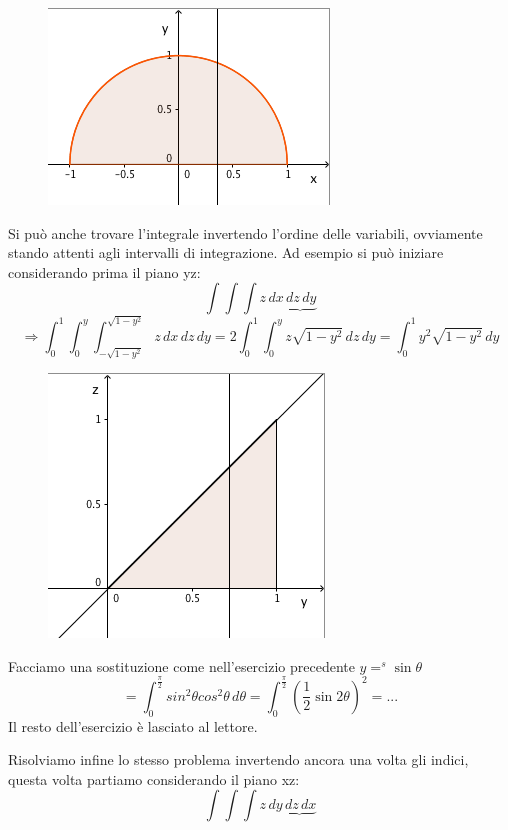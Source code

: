 \documentclass[10pt]{article}
\theoremstyle{plain}
\theoremstyle{definition}
\begin{document}
\begin{figure}[ht]
\centering
\centerline{\includegraphics[width=75 mm,scale=1]{latex_img2.png}}
\label{fig: }
\end{figure}
Si può anche trovare l'integrale invertendo l'ordine delle variabili, ovviamente stando attenti agli intervalli di integrazione. Ad esempio si può iniziare considerando prima il piano yz:
$$\int \int \int z \,dx \underbrace{\,dz \,dy}$$
$$\Rightarrow \int_{0}^{1} \int_{0}^{y} \int_{-\sqrt{1-y^2}}^{\sqrt{1-y^2}}z \,dx \,dz \,dy = 2\int_{0}^{1} \int_{0}^{y} z \sqrt{1-y^2} \,dz \,dy = \int_{0}^{1} y^2 \sqrt{1-y^2} \,dy$$

\begin{figure}[ht]
\centering
\centerline{\includegraphics[width=75 mm,scale=1]{latex_img3.png}}
\label{fig: }
\end{figure}

Facciamo una sostituzione come nell'esercizio precedente \qquad $y =^s \sin{\theta}$
$$=\int_{0}^{\frac{\pi}{2}} sin^2\theta cos^2\theta \,d\theta = \int_{0}^{\frac{\pi}{2}} \left( \frac{1}{2} \sin{2\theta}\right)^2 = ...$$
Il resto dell'esercizio è lasciato al lettore.

\bigskip
Risolviamo infine lo stesso problema invertendo ancora una volta gli indici, questa volta partiamo considerando il piano xz:
$$\int \int \int z \,dy \underbrace{\,dz \,dx}$$
\end{document}
